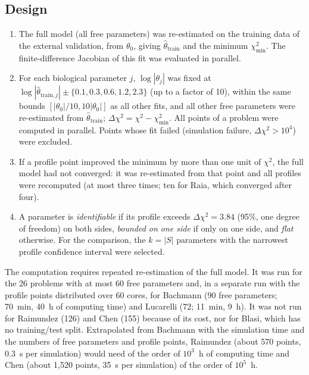 \subsection*{Design}
\begin{enumerate}\itemsep0pt
\item The full model (all free parameters) was re-estimated on the training data of the external validation, from $\theta_0$, giving $\hat\theta_{\mathrm{train}}$ and the minimum $\chi^2_{\min}$. The finite-difference Jacobian of this fit was evaluated in parallel.
\item For each biological parameter $j$, $\log|\theta_j|$ was fixed at $\log|\hat\theta_{\mathrm{train},j}|\pm\{0.1,0.3,0.6,1.2,2.3\}$ (up to a factor of 10), within the same bounds $[|\theta_0|/10,10|\theta_0|]$ as all other fits, and all other free parameters were re-estimated from $\hat\theta_{\mathrm{train}}$; $\Delta\chi^2=\chi^2-\chi^2_{\min}$. All points of a problem were computed in parallel. Points whose fit failed (simulation failure, $\Delta\chi^2>10^4$) were excluded.
\item If a profile point improved the minimum by more than one unit of $\chi^2$, the full model had not converged: it was re-estimated from that point and all profiles were recomputed (at most three times; ten for Raia, which converged after four).
\item A parameter is \emph{identifiable} if its profile exceeds $\Delta\chi^2=3.84$ (95\%, one degree of freedom) on both sides, \emph{bounded on one side} if only on one side, and \emph{flat} otherwise. For the comparison, the $k=|S|$ parameters with the narrowest profile confidence interval were selected.
\end{enumerate}
The computation requires repeated re-estimation of the full model. It was run for the 26 problems with at most 60 free parameters and, in a separate run with the profile points distributed over 60 cores, for Bachmann (90 free parameters; 70~min, 40~h of computing time) and Lucarelli (72; 11~min, 9~h). It was not run for Raimundez (126) and Chen (155) because of its cost, nor for Blasi, which has no training/test split. Extrapolated from Bachmann with the simulation time and the numbers of free parameters and profile points, Raimundez (about 570 points, 0.3~s per simulation) would need of the order of $10^3$~h of computing time and Chen (about 1,520 points, 35~s per simulation) of the order of $10^5$~h.

